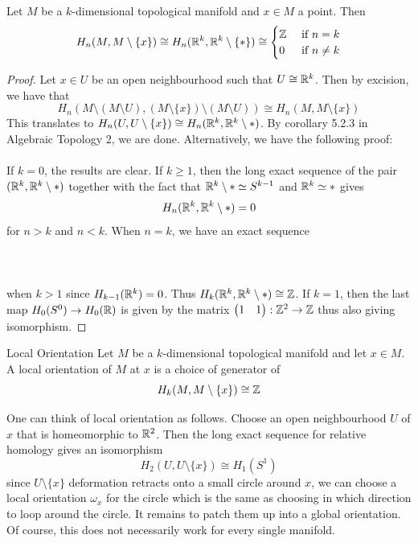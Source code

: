 \documentclass[a4paper]{article}
\begin{document}
\begin{prp}{}{} Let $M$ be a $k$-dimensional topological manifold and $x\in M$ a point. Then $$H_n(M,M\setminus\{x\})\cong H_n(\mathbb{R}^k,\mathbb{R}^k\setminus\{\ast\})\cong\begin{cases}
\mathbb{Z} & \text{ if } n=k\\
0 & \text{ if } n\neq k
\end{cases}$$ \tcbline
\begin{proof}
Let $x\in U$ be an open neighbourhood such that $U\cong\mathbb{R}^k$. Then by excision, we have that $$H_n(M\setminus(M\setminus U),(M\setminus\{x\})\setminus(M\setminus U))\cong H_n(M,M\setminus\{x\})$$ This translates to $H_n(U,U\setminus\{x\})\cong H_n(\mathbb{R}^k,\mathbb{R}^k\setminus\ast)$. By corollary 5.2.3 in Algebraic Topology 2, we are done. Alternatively, we have the following proof: \\~\\

If $k=0$, the results are clear. If $k\geq 1$, then the long exact sequence of the pair $(\mathbb{R}^k,\mathbb{R}^k\setminus\ast)$ together with the fact that $\mathbb{R}^k\setminus\ast\simeq S^{k-1}$ and $\mathbb{R}^k\simeq\ast$ gives $$H_n(\mathbb{R}^k,\mathbb{R}^k\setminus\ast)=0$$ for $n>k$ and $n<k$. When $n=k$, we have an exact sequence \\~\\
\\~\\
when $k>1$ since $H_{k-1}(\mathbb{R}^k)=0$. Thus $H_k(\mathbb{R}^k,\mathbb{R}^k\setminus\ast)\cong\mathbb{Z}$. If $k=1$, then the last map $H_0(S^0)\to H_0(\mathbb{R})$ is given by the matrix $\begin{pmatrix}
1 & 1
\end{pmatrix}:\mathbb{Z}^2\to\mathbb{Z}$ thus also giving isomorphism. 
\end{proof}
\end{prp}

\begin{defn}{Local Orientation}{} Let $M$ be a $k$-dimensional topological manifold and let $x\in M$. A local orientation of $M$ at $x$ is a choice of generator of $$H_k(M,M\setminus\{x\})\cong\mathbb{Z}$$
\end{defn}

One can think of local orientation as follows. Choose an open neighbourhood $U$ of $x$ that is homeomorphic to $\mathbb{R}^2$. Then the long exact sequence for relative homology gives an isomorphism $$H_2(U,U\setminus\{x\})\cong H_1(S^1)$$ since $U\setminus\{x\}$ deformation retracts onto a small circle around $x$, we can choose a local orientation $\omega_x$ for the circle which is the same as choosing in which direction to loop around the circle. It remains to patch them up into a global orientation. Of course, this does not necessarily work for every single manifold. \\~\\
\end{document}
